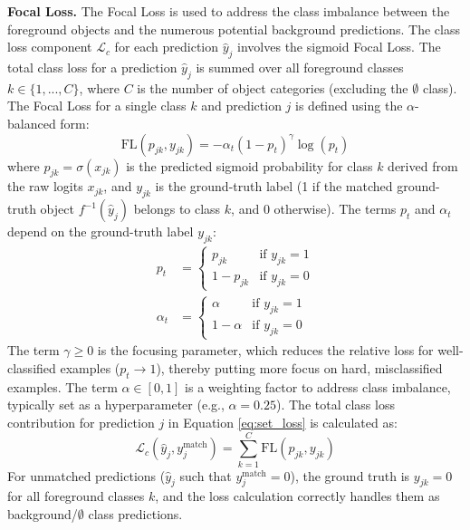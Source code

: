 \textbf{Focal Loss.} The Focal Loss \cite{linFocalLossDense2018} is used to address the class imbalance between the foreground objects and the numerous potential background predictions. The class loss component $\mathcal{L}_c$ for each prediction $\hat{y}_j$ involves the sigmoid Focal Loss. The total class loss for a prediction $\hat{y}_j$ is summed over all foreground classes $k \in \{1, ..., C\}$, where $C$ is the number of object categories (excluding the $\emptyset$ class). The Focal Loss for a single class $k$ and prediction $j$ is defined using the $\alpha$-balanced form:
\begin{equation} \label{eq:focal_loss_corrected} %
    \text{FL}(p_{jk}, y_{jk}) = - \alpha_t (1 - p_t)^\gamma \log(p_t)
\end{equation}
where $p_{jk} = \sigma(x_{jk})$ is the predicted sigmoid probability for class $k$ derived from the raw logits $x_{jk}$, and $y_{jk}$ is the ground-truth label (1 if the matched ground-truth object $f^{-1}(\hat{y}_j)$ belongs to class $k$, and 0 otherwise). The terms $p_t$ and $\alpha_t$ depend on the ground-truth label $y_{jk}$:
\begin{align*}
    p_t &= 
    \begin{cases} 
        p_{jk} & \text{if } y_{jk} = 1 \\
        1 - p_{jk} & \text{if } y_{jk} = 0 
    \end{cases} \\
    \alpha_t &= 
    \begin{cases} 
        \alpha & \text{if } y_{jk} = 1 \\
        1 - \alpha & \text{if } y_{jk} = 0 
    \end{cases}
\end{align*}
The term $\gamma \ge 0$ is the focusing parameter, which reduces the relative loss for well-classified examples ($p_t \to 1$), thereby putting more focus on hard, misclassified examples. The term $\alpha \in [0, 1]$ is a weighting factor to address class imbalance, typically set as a hyperparameter (e.g., $\alpha=0.25$). The total class loss contribution for prediction $j$ in Equation \ref{eq:set_loss} is calculated as:
\begin{equation*}
    \mathcal{L}_c(\hat{y}_j, y_j^{\text{match}}) = \sum_{k=1}^{C} \text{FL}(p_{jk}, y_{jk}) 
\end{equation*}
For unmatched predictions ($\hat{y}_j$ such that $y_j^{\text{match}} = 0$), the ground truth is $y_{jk}=0$ for all foreground classes $k$, and the loss calculation correctly handles them as background/$\emptyset$ class predictions.

